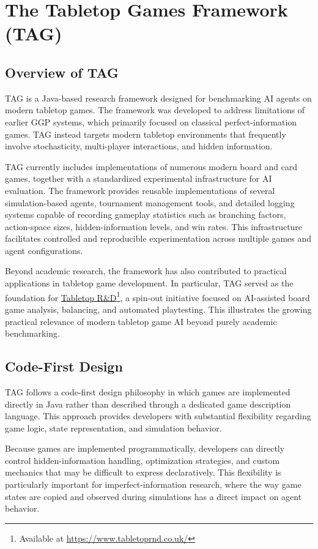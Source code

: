 \section{The Tabletop Games Framework (TAG)}
\subsection{Overview of TAG}
TAG\cite{gaina2020tag} is a Java-based research framework designed for benchmarking AI agents on modern tabletop games. The framework was developed to address limitations of earlier GGP systems, which primarily focused on classical perfect-information games. TAG instead targets modern tabletop environments that frequently involve stochasticity, multi-player interactions, and hidden information.

TAG currently includes implementations of numerous modern board and card games, together with a standardized experimental infrastructure for AI evaluation\cite{gaina2020designimplementationtagtabletop}. The framework provides reusable implementations of several simulation-based agents, tournament management tools, and detailed logging systems capable of recording gameplay statistics such as branching factors, action-space sizes, hidden-information levels, and win rates. This infrastructure facilitates controlled and reproducible experimentation across multiple games and agent configurations.

Beyond academic research, the framework has also contributed to practical applications in tabletop game development. In particular, TAG served as the foundation for \hyperlink{https://www.tabletoprnd.co.uk/}{Tabletop R\&D}\footnote{Available at \url{https://www.tabletoprnd.co.uk/}}, a spin-out initiative focused on AI-assisted board game analysis, balancing, and automated playtesting. This illustrates the growing practical relevance of modern tabletop game AI beyond purely academic benchmarking.

\subsection{Code-First Design}
TAG follows a code-first design philosophy in which games are implemented directly in Java rather than described through a dedicated game description language. This approach provides developers with substantial flexibility regarding game logic, state representation, and simulation behavior.

Because games are implemented programmatically, developers can directly control hidden-information handling, optimization strategies, and custom mechanics that may be difficult to express declaratively. This flexibility is particularly important for imperfect-information research, where the way game states are copied and observed during simulations has a direct impact on agent behavior.

